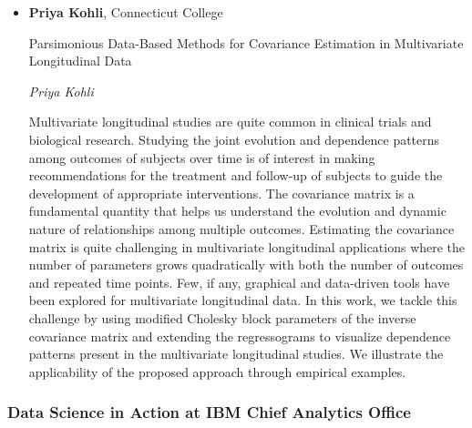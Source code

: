 \begin{itemize}
\item \textbf{Priya Kohli}, Connecticut College

Parsimonious Data-Based Methods for Covariance Estimation in Multivariate Longitudinal Data

\emph{\footnotesize Priya Kohli}

Multivariate longitudinal studies are quite common in clinical trials and biological research. Studying the joint evolution and dependence patterns among outcomes of subjects over time is of interest in making recommendations for the treatment and follow-up of subjects to guide the development of appropriate interventions. The covariance matrix is a fundamental quantity that helps us understand the evolution and dynamic nature of relationships among multiple outcomes. Estimating the covariance matrix is quite challenging in multivariate longitudinal applications where the number of parameters grows quadratically with both the number of outcomes and repeated time points. Few, if any, graphical and data-driven tools have been explored for multivariate longitudinal data. In this work, we tackle this challenge by using modified Cholesky block parameters of the inverse covariance matrix and extending the regressograms to visualize dependence patterns present in the multivariate longitudinal studies. We illustrate the applicability of the proposed approach through empirical examples.

\end{itemize}

\subsubsection*{Data Science in Action at IBM Chief Analytics Office}

